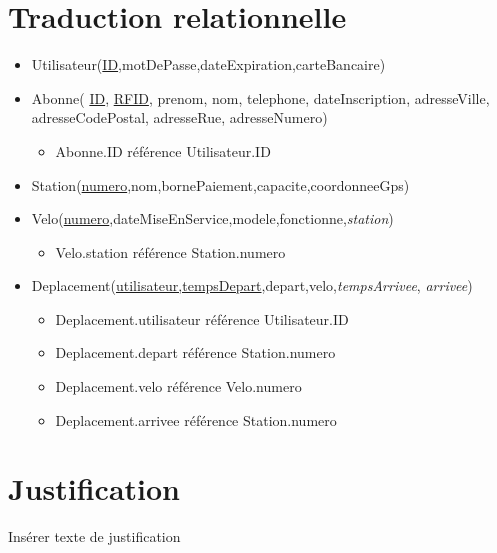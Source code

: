 \documentclass[a4paper, 12pt]{report}
\begin{document}
\section*{Traduction relationnelle} %
	
	\begin{itemize}
	
		\item Utilisateur(\underline{ID},motDePasse,dateExpiration,carteBancaire)
		
		\item Abonne( \underline{ID}, \underline{RFID}, prenom, nom, telephone, dateInscription, 				adresseVille, adresseCodePostal, adresseRue, adresseNumero)
		
		\begin{itemize}
			\item Abonne.ID référence Utilisateur.ID
		\end{itemize}
		
		\item Station(\underline{numero},nom,bornePaiement,capacite,coordonneeGps)
		
		\item Velo(\underline{numero},dateMiseEnService,modele,fonctionne,\textit{station})
		
		\begin{itemize}
			\item Velo.station référence Station.numero
		\end{itemize}
		
		\item Deplacement(\underline{utilisateur,tempsDepart},depart,velo,\textit{tempsArrivee},				\textit{arrivee})
		
		\begin{itemize}
			\item Deplacement.utilisateur référence Utilisateur.ID
			\item Deplacement.depart référence Station.numero
			\item Deplacement.velo référence Velo.numero
			\item Deplacement.arrivee référence Station.numero
		\end{itemize}
		
	\end{itemize}

\section*{Justification}
	Insérer texte de justification
\end{document}
